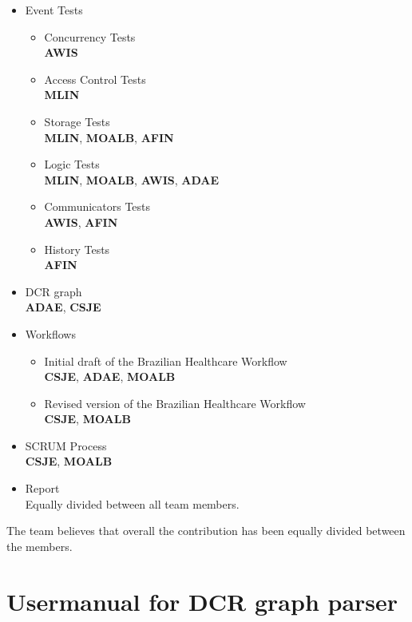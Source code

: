\begin{itemize}
	\item Event Tests
	\begin{itemize}
		\item Concurrency Tests\\
		\textbf{AWIS}
		\item Access Control Tests\\
		\textbf{MLIN}
		\item Storage Tests\\
		\textbf{MLIN}, \textbf{MOALB}, \textbf{AFIN}
		\item Logic Tests\\
		\textbf{MLIN}, \textbf{MOALB}, \textbf{AWIS}, \textbf{ADAE}
		\item Communicators Tests\\
		\textbf{AWIS}, \textbf{AFIN}
		\item History Tests\\
		\textbf{AFIN}
	\end{itemize}
	\item DCR graph\\
	\textbf{ADAE}, \textbf{CSJE}
	\item Workflows
	\begin{itemize}
		\item Initial draft of the Brazilian Healthcare Workflow\\
		\textbf{CSJE}, \textbf{ADAE}, \textbf{MOALB}
		\item Revised version of the Brazilian Healthcare Workflow\\
		\textbf{CSJE}, \textbf{MOALB}
	\end{itemize}
	\item SCRUM Process\\
	\textbf{CSJE}, \textbf{MOALB}
	\item Report\\
	Equally divided between all team members.
\end{itemize}

The team believes that overall the contribution has been equally divided between the members.



\section{Usermanual for DCR graph parser \label{sec:UsermanualForDcrGraphParser}}
